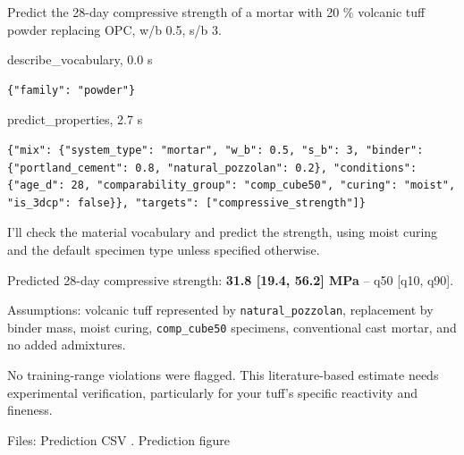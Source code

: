 \begin{userbox}
Predict the 28-day compressive strength of a mortar with 20 \% volcanic tuff powder replacing OPC, w/b 0.5, s/b 3.
\end{userbox}
\begin{toolbox}{describe\_vocabulary, 0.0 s}
\begin{lstlisting}[style=argstyle]
{"family": "powder"}
\end{lstlisting}
\end{toolbox}
\begin{toolbox}{predict\_properties, 2.7 s}
\begin{lstlisting}[style=argstyle]
{"mix": {"system_type": "mortar", "w_b": 0.5, "s_b": 3, "binder": {"portland_cement": 0.8, "natural_pozzolan": 0.2}, "conditions": {"age_d": 28, "comparability_group": "comp_cube50", "curing": "moist", "is_3dcp": false}}, "targets": ["compressive_strength"]}
\end{lstlisting}
\end{toolbox}
\begin{agentbox}
I'll check the material vocabulary and predict the strength, using moist curing and the default specimen type unless specified otherwise.\par
Predicted 28-day compressive strength: \textbf{31.8 [19.4, 56.2] MPa} -- q50 [q10, q90].\par
\par
Assumptions: volcanic tuff represented by \texttt{natural\_pozzolan}, replacement by binder mass, moist curing, \texttt{comp\_cube50} specimens, conventional cast mortar, and no added admixtures.\par
\par
No training-range violations were flagged. This literature-based estimate needs experimental verification, particularly for your tuff's specific reactivity and fineness.\par
\par
Files: Prediction CSV . Prediction figure\par
\par
\end{agentbox}